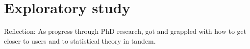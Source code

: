 \section{Exploratory study} \label{sec:exploratoryStudy}

Reflection: As progress through PhD research, got and grappled with how to get
closer to users and to statistical theory in tandem.
